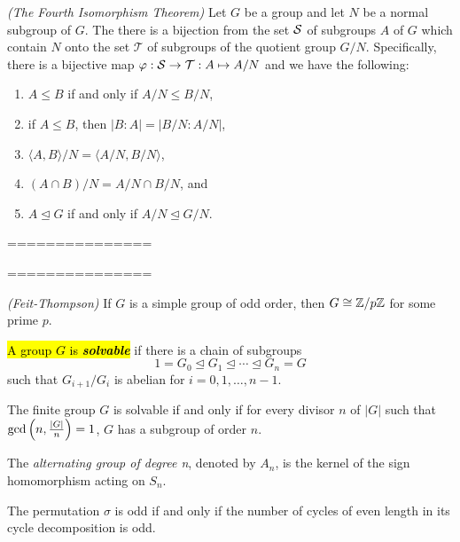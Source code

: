 \begin{thm}\textit{(The Fourth Isomorphism Theorem)}
Let $G$ be a group and let $N$ be a normal subgroup of $G$. The there is a bijection from the set $\mathcal{S}$ of subgroups $A$ of $G$ which contain $N$ onto the set $\mathcal{T}$ of subgroups of the quotient group $G/N$. Specifically, there is a bijective map $\varphi:\mathcal{S} \rightarrow \mathcal{T}:A\mapsto A/N$ and we have the following:
\begin{enumerate}
\item $A\leq B$ if and only if $A/N\leq B/N$,
\item if $A\leq B$, then $|B:A| = |B/N:A/N|$,
\item $\langle A, B\rangle/N = \langle A/N, B/N\rangle$,
\item $(A\cap B)/N = A/N\cap B/N$, and 
\item $A\unlhd G$ if and only if $A/N \unlhd G/N$.
\end{enumerate}
\end{thm}


===============

===============

\begin{thm}\textit{(Feit-Thompson)}
If $G$ is a simple group of odd order, then $G\cong\mathbb{Z}/p\mathbb{Z}$ for some prime $p$.
\end{thm}

\nl

\begin{defn}
\hl{A group $G$ is \textbf{\textit{solvable}}} if there is a chain of subgroups 
\[1 = G_0\unlhd G_1\unlhd\cdots\unlhd G_n = G\]
such that $G_{i+1}/G_i$ is abelian for $i= 0,1,\ldots,n-1$.
\end{defn}

\nl

\begin{thm}
The finite group $G$ is solvable if and only if for every divisor $n$ of $|G|$ such that $\gcd\left( n,\frac{|G|}{n}\right) = 1$, $G$ has a subgroup of order $n$.
\end{thm}

\nl

\begin{defn}
The \textit{alternating group of degree n}, denoted by $A_n$, is the kernel of the sign homomorphism acting on $S_n$.
\end{defn}

\nl

\begin{prop}
The permutation $\sigma$ is odd if and only if the number of cycles of even length in its cycle decomposition is odd.
\end{prop}

